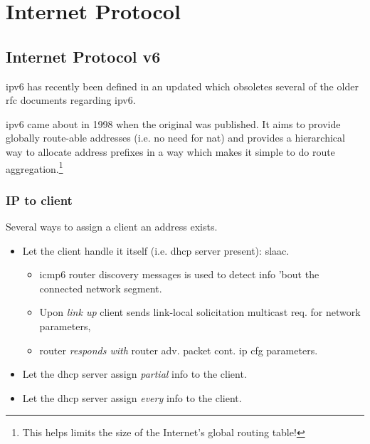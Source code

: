 
\chapter[IP]{Internet Protocol}

\section[IPv6]{Internet Protocol v6}

\gls{ipv6} has recently been defined in an updated  which obsoletes several of the older \gls{rfc} documents regarding \gls{ipv6}.

\gls{ipv6} came about in 1998 when the original  was published. It aims to provide globally route-able addresses (i.e. no need for \gls{nat}) and provides a hierarchical way to allocate address prefixes in a way which makes it simple to do route aggregation.\footnote{This helps limits the size of the Internet's global routing table!}\cite{wiki:IPv6}


\subsection{IP to client}

Several ways to assign a client an address exists.
\begin{itemize}
    \item Let the client handle it itself (i.e. \gls{dhcp} server present): \gls{slaac}.
    \begin{itemize}
        \item \gls{icmp6} router discovery messages is used to detect info 'bout the connected network segment.
        \item Upon \textit{link up} client sends link-local solicitation multicast req. for network parameters,
        \item router \textit{responds with}  router adv. packet cont. \gls{ip} cfg parameters.
    \end{itemize}
    \item Let the \gls{dhcp} server assign \textit{partial} info to the client.
    \item Let the \gls{dhcp} server assign \textit{every} info to the client.
\end{itemize}

